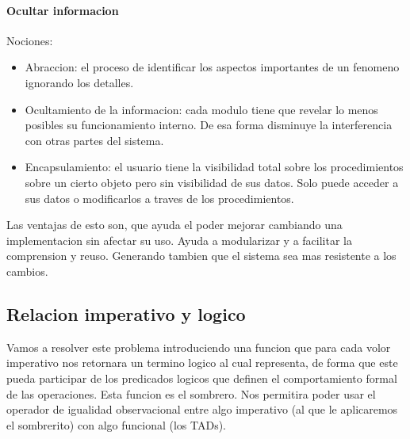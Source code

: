 \documentclass[11pt]{article}
\begin{document}
\paragraph{Ocultar informacion}
Nociones:
\begin{itemize}
    \item Abraccion: el proceso de identificar los aspectos importantes de un
        fenomeno ignorando los detalles.
    \item Ocultamiento de la informacion: cada modulo tiene que revelar lo menos posibles
        su funcionamiento interno.
        De esa forma disminuye la interferencia con otras partes del sistema.
    \item Encapsulamiento: el usuario tiene la visibilidad total sobre los procedimientos
        sobre un cierto objeto pero sin visibilidad de sus datos.
        Solo puede acceder a sus datos o modificarlos a traves de los procedimientos.
\end{itemize}

Las ventajas de esto son, que ayuda el poder mejorar cambiando una implementacion
sin afectar su uso.
Ayuda a modularizar y a facilitar la comprension y reuso.
Generando tambien que el sistema sea mas resistente a los cambios.

\subsection{Relacion imperativo y logico}

Vamos a resolver este problema introduciendo una funcion que para cada volor imperativo
nos retornara un termino logico al cual representa, de forma que este pueda participar
de los predicados logicos que definen el comportamiento formal de las operaciones.
Esta funcion es el sombrero.
Nos permitira poder usar el operador de igualidad observacional entre algo imperativo
(al que le aplicaremos el sombrerito) con algo funcional (los TADs).
\end{document}
